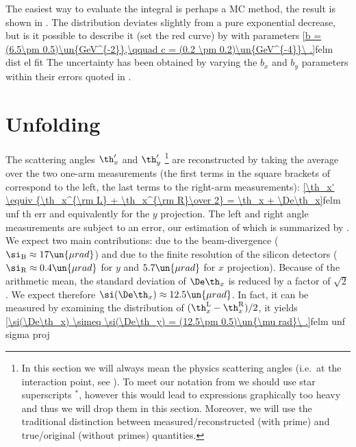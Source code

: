 The easiest way to evaluate the integral  is perhaps a MC method, the result is shown in . The distribution deviates slightly from a pure exponential decrease, but is it possible to describe it (set the red curve) by
with parameters
\eqref{b = (6.5\pm 0.5)\un{GeV^{-2}},\qquad c = (0.2 \pm 0.2)\un{GeV^{-4}}\ .}{felm dist el fit}
The uncertainty has been obtained by varying the $b_x$ and $b_y$ parameters within their errors quoted in .
\fi

\section[felm unfold]{Unfolding}

The scattering angles $\th_x'$ and $\th_y'$ \footnote{
In this section we will always mean the physics scattering angles (i.e.~at the interaction point, see ). To meet our notation from  we should use star superscripts $^*$, however this would lead to expressions graphically too heavy and thus we will drop them in this section. Moreover, we will use the traditional distinction between measured/reconstructed (with prime) and true/original (without primes) quantities.
} are reconstructed by taking the average over the two one-arm measurements (the first terms in the square brackets of  correspond to the left, the last terms to the right-arm measurements):
\eqref{\th_x' \equiv {\th_x^{\rm L} + \th_x^{\rm R}\over 2} = \th_x + \De\th_x}{felm unf th err}
and equivalently for the $y$ projection. The left and right angle measurements are subject to an error, our estimation of which is summarized by . We expect two main contributions: due to the beam-divergence ($\si_{\rm B} \approx 17\un{\mu rad}$) and due to the finite resolution of the silicon detectors (
$\si_{\rm R} \approx 0.4\un{\mu rad}$ for $y$ and $5.7\un{\mu rad}$ for $x$ projection). Because of the arithmetic mean, the standard deviation of $\De\th_x$ is reduced by a factor of $\sqrt 2$. We expect therefore $\si(\De\th_x) \approx 12.5\un{\mu rad}$. In fact, it can be measured by examining the distribution of $(\th_x^{\rm L} - \th_x^{\rm R})/2$, it yields
\eqref{\si(\De\th_x) \simeq \si(\De\th_y) = (12.5\pm 0.5)\un{\mu rad}\ .}{felm unf sigma proj}

